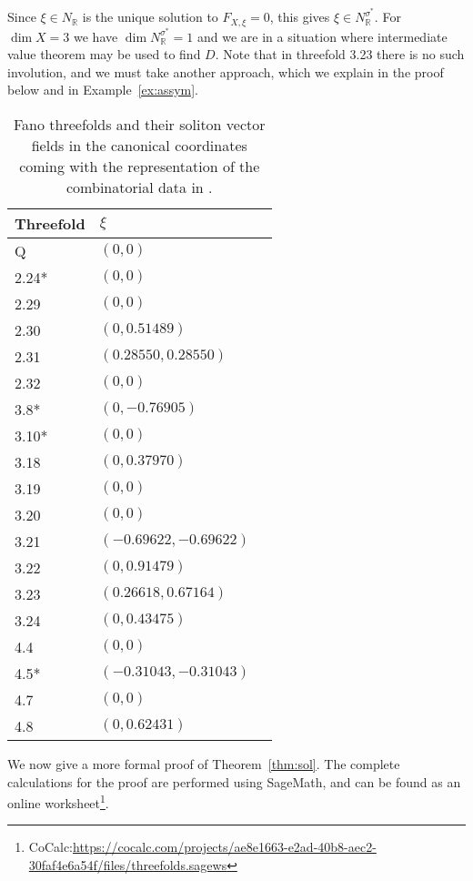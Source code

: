 Since \(\xi \in N_\mathbb{R}\) is the unique solution to \(F_{X,\xi} = 0\), this gives \(\xi \in N_{\mathbb{R}}^{\sigma^*}\). For \(\dim X = 3\) we have \(\dim N_{\mathbb{R}}^{\sigma^*}  = 1\) and we are in a situation where intermediate value theorem may be used to find \(D\). Note that in threefold 3.23 there is no such involution, and we must take another approach, which we explain in the proof below and in Example~\ref{ex:assym}.
%
%
%
\begin{table}[H]  \centering
\captionsetup{width=.95\linewidth}
\caption{Fano threefolds and their soliton vector fields in the canonical coordinates coming with the representation of the combinatorial data in \cite{suss2013fano}.}  \label{table:solitontable}
\begin{tabular}{l l l}
\toprule
Threefold & $\xi$ & \\ \hline
Q & $(0,0)$ \\
2.24* & $(0,0)$ \\
2.29 & $(0,0)$ \\
2.30 & $(0,0.51489)$ \\
2.31 & $(0.28550,0.28550)$\\
2.32 & $(0,0)$ \\
3.8* & $(0,-0.76905)$ \\
3.10* & $(0,0)$ \\
3.18 & $(0,0.37970)$ \\
3.19 & $(0,0)$ \\
3.20 & $(0,0)$ \\
3.21 & $(-0.69622,-0.69622)$ \\
3.22 & $(0,0.91479)$ \\
3.23 & $(0.26618,  0.67164)$ \\
3.24 & $(0,0.43475)$ \\
4.4 &  $(0,0)$ \\
4.5* &  $(-0.31043,-0.31043)$ \\
4.7 &  $(0,0)$ \\
4.8 &  $(0,0.62431)$ \\
\bottomrule
\end{tabular}
\label{table:name}
\end{table}
We now give a more formal proof of Theorem~\ref{thm:sol}. The complete calculations for the proof are performed using SageMath, and can be found as an online worksheet\footnote{CoCalc:\url{https://cocalc.com/projects/ae8e1663-e2ad-40b8-aec2-30faf4e6a54f/files/threefolds.sagews}}.
